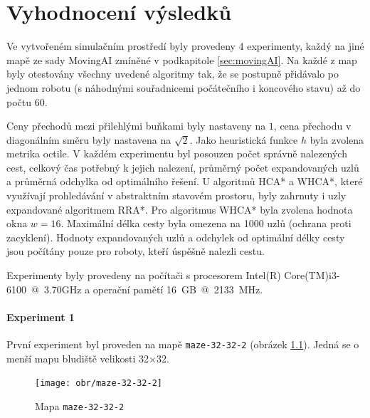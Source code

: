 

\cleardoublepage
\chapter{Vyhodnocení výsledků}
Ve vytvořeném simulačním prostředí byly provedeny 4 experimenty, každý na jiné mapě ze sady MovingAI \cite{Sturtevant2012} zmíněné v podkapitole \ref{sec:movingAI}. Na každé z map byly otestovány všechny uvedené algoritmy tak, že se postupně přidávalo po jednom robotu (s náhodnými souřadnicemi počátečního i koncového stavu) až do počtu 60. 

Ceny přechodů mezi přilehlými buňkami byly nastaveny na $1$, cena přechodu v diagonálním směru byly nastavena na $\sqrt{2}$. Jako heuristická funkce $h$ byla zvolena metrika octile. V každém experimentu byl posouzen počet správně nalezených cest, celkový čas potřebný k jejich nalezení, průměrný počet expandovaných uzlů a průměrná odchylka od optimálního řešení. U algoritmů HCA* a WHCA*, které využívají prohledávání v abstraktním stavovém prostoru, byly zahrnuty i uzly expandované algoritmem RRA*. Pro algoritmus WHCA* byla zvolena hodnota okna $w=16$. Maximální délka cesty byla omezena na 1000 uzlů (ochrana proti zacyklení). Hodnoty expandovaných uzlů a odchylek od optimální délky cesty jsou počítány pouze pro roboty, kteří úspěšně nalezli cestu.

Experimenty byly provedeny na počítači s procesorem Intel(R) Core(TM)\linebreak i3-6100~@~3.70GHz a operační pamětí 16~GB~@~2133~MHz.

\subsubsection{Experiment 1}
První experiment byl proveden na mapě \texttt{maze-32-32-2} (obrázek \ref{obr:maze-32-32-2}). Jedná se o menší mapu bludiště velikosti 32×32. 


\begin{figure}[htb]
	\begin{center}
		\texttt{[image: obr/maze-32-32-2]}
	\end{center}
	\caption[caption]{Mapa \texttt{maze-32-32-2}  \cite{Sturtevant2012}}
	\label{obr:maze-32-32-2}
\end{figure}

